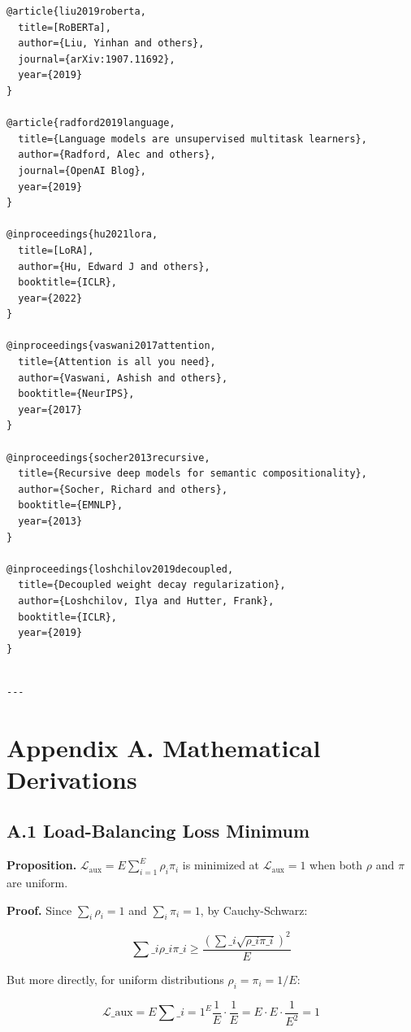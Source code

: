 \begin{lstlisting}
@article{liu2019roberta,
  title=[RoBERTa],
  author={Liu, Yinhan and others},
  journal={arXiv:1907.11692},
  year={2019}
}

@article{radford2019language,
  title={Language models are unsupervised multitask learners},
  author={Radford, Alec and others},
  journal={OpenAI Blog},
  year={2019}
}

@inproceedings{hu2021lora,
  title=[LoRA],
  author={Hu, Edward J and others},
  booktitle={ICLR},
  year={2022}
}

@inproceedings{vaswani2017attention,
  title={Attention is all you need},
  author={Vaswani, Ashish and others},
  booktitle={NeurIPS},
  year={2017}
}

@inproceedings{socher2013recursive,
  title={Recursive deep models for semantic compositionality},
  author={Socher, Richard and others},
  booktitle={EMNLP},
  year={2013}
}

@inproceedings{loshchilov2019decoupled,
  title={Decoupled weight decay regularization},
  author={Loshchilov, Ilya and Hutter, Frank},
  booktitle={ICLR},
  year={2019}
}
\end{lstlisting}
\begin{lstlisting}

---
\end{lstlisting}

\section{Appendix A. Mathematical Derivations}

\subsection{A.1 Load-Balancing Loss Minimum}

\textbf{Proposition.} $\mathcal{L}_\text{aux} = E \sum_{i=1}^{E} \rho_i \pi_i$ 
is minimized at $\mathcal{L}_\text{aux} = 1$ when both $\rho$ and $\pi$ are 
uniform.

\textbf{Proof.} Since $\sum_i \rho_i = 1$ and $\sum_i \pi_i = 1$, by Cauchy-Schwarz:

\[
\sum\_i \rho\_i \pi\_i \geq \frac{(\sum\_i \sqrt{\rho\_i \pi\_i})^2}{E}
\]

But more directly, for uniform distributions $\rho_i = \pi_i = 1/E$:

\[
\mathcal{L}\_\text{aux} = E \sum\_{i=1}^{E} \frac{1}{E} \cdot \frac{1}{E} = E \cdot E \cdot \frac{1}{E^2} = 1
\]

